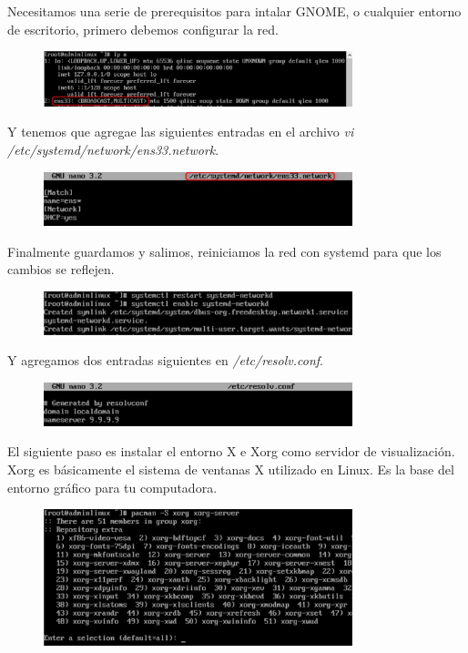\documentclass[11pt,letterpaper]{article}
\begin{document}
Necesitamos una serie de prerequisitos para intalar GNOME, o cualquier entorno de escritorio, primero debemos configurar la red.
\begin{figure}[H]
        \centering
        \includegraphics[width=0.8\textwidth]{img/29.png}
        \label{img:Imagen 4}
\end{figure}
Y tenemos que agregae las siguientes entradas en el archivo \textit{vi /etc/systemd/network/ens33.network}.
\begin{figure}[H]
        \centering
        \includegraphics[width=0.8\textwidth]{img/30.png}
        \label{img:Imagen 4}
\end{figure}

Finalmente guardamos y salimos, reiniciamos la red con systemd para que los cambios se reflejen.
\begin{figure}[H]
        \centering
        \includegraphics[width=0.8\textwidth]{img/31.png}
        \label{img:Imagen 4}
\end{figure}
Y agregamos dos entradas siguientes en \textit{/etc/resolv.conf}.
\begin{figure}[H]
        \centering
        \includegraphics[width=0.8\textwidth]{img/32.png}
        \label{img:Imagen 4}
\end{figure}
El siguiente paso es instalar el entorno X e Xorg como servidor de visualización. Xorg es básicamente el sistema de ventanas X utilizado en Linux. Es la base del entorno gráfico para tu computadora. 

\begin{figure}[H]
        \centering
        \includegraphics[width=0.8\textwidth]{img/33.png}
        \label{img:Imagen 4}
\end{figure}
\end{document}
